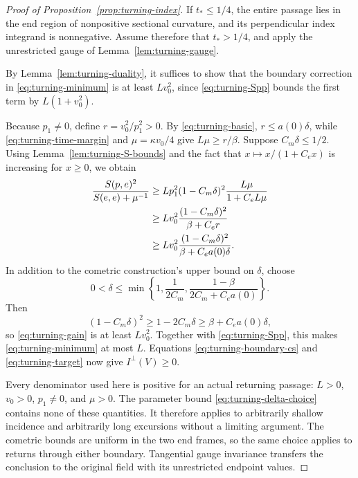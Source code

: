 \begin{proof}[Proof of Proposition~\ref{prop:turning-index}]
If $t_*\le1/4$, the entire passage lies in the end region of nonpositive
sectional curvature, and its perpendicular index integrand is
nonnegative.  Assume therefore that $t_*>1/4$, and apply the unrestricted
gauge of Lemma~\ref{lem:turning-gauge}.

By Lemma~\ref{lem:turning-duality}, it suffices to show that
the boundary correction in \eqref{eq:turning-minimum} is at least
$Lv_0^2$, since \eqref{eq:turning-Spp} bounds the first term by
$L(1+v_0^2)$.

Because $p_1\ne0$, define $r=v_0^2/p_1^2>0$.  By
\eqref{eq:turning-basic}, $r\le a(0)\delta$, while
\eqref{eq:turning-time-margin} and $\mu=\kappa v_0/4$ give
$L\mu\ge r/\beta$.  Suppose $C_m\delta\le1/2$.
Using Lemma~\ref{lem:turning-S-bounds} and the fact that
$x\mapsto x/(1+C_e x)$ is increasing for $x\ge0$, we obtain
\begin{align}
 \frac{S(p,e)^2}{S(e,e)+\mu^{-1}}
 &\ge Lp_1^2(1-C_m\delta)^2\frac{L\mu}{1+C_eL\mu}\notag\\
 &\ge Lv_0^2\frac{(1-C_m\delta)^2}{\beta+C_e r}\notag\\
 &\ge Lv_0^2\frac{(1-C_m\delta)^2}
                          {\beta+C_ea(0)\delta}.
 \label{eq:turning-gain}
\end{align}
In addition to the cometric construction's upper bound on $\delta$,
choose
\begin{equation}\label{eq:turning-delta-choice}
 0<\delta\le
 \min\left\{1,\frac1{2C_m},
                \frac{1-\beta}{2C_m+C_ea(0)}\right\}.
\end{equation}
Then
\[
 (1-C_m\delta)^2\ge1-2C_m\delta
                 \ge\beta+C_ea(0)\delta,
\]
so \eqref{eq:turning-gain} is at least $Lv_0^2$.
Together with \eqref{eq:turning-Spp}, this makes
\eqref{eq:turning-minimum} at most $L$.  Equations
\eqref{eq:turning-boundary-cs} and \eqref{eq:turning-target} now give
$I^\perp(V)\ge0$.

Every denominator used here is positive for an actual returning passage:
$L>0$, $v_0>0$, $p_1\ne0$, and $\mu>0$.  The parameter bound
\eqref{eq:turning-delta-choice} contains none of these quantities.
It therefore applies to arbitrarily shallow incidence and arbitrarily
long excursions without a limiting argument.  The cometric bounds are
uniform in the two end frames, so the same choice applies to returns
through either boundary.  Tangential gauge invariance transfers the
conclusion to the original field with its unrestricted endpoint values.
\end{proof}

